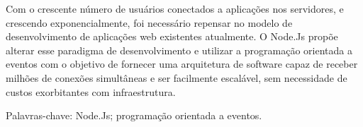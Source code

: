 \begin{resumo}
\vspace{-1cm}

\onehalfspacing

\noindent 
  Com o crescente número de usuários conectados a aplicações nos servidores, e crescendo exponencialmente, 
  foi necessário repensar no modelo de desenvolvimento de aplicações web existentes atualmente. 
  O Node.Js propõe alterar esse paradigma de desenvolvimento e utilizar a programação orientada a eventos 
  com o objetivo de fornecer uma arquitetura de software capaz de receber milhões de conexões simultâneas 
  e ser facilmente escalável, sem necessidade de custos exorbitantes com infraestrutura.

\vspace*{.75cm}

\noindent Palavras-chave:  Node.Js; programação orientada a eventos.\\

\end{resumo}
